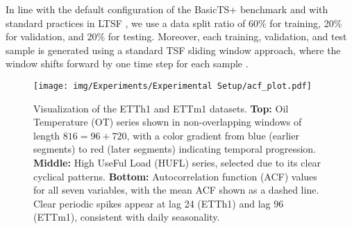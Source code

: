 \documentclass[a4paper,oneside,bibliography=totoc]{scrbook}
\begin{document}
In line with the default configuration of the BasicTS+ benchmark and with standard practices in LTSF \cite{zhou_informer_2021, nie_time_2022, liu_itransformer_2023, shang_ada-mshyper_2024}, we use a data split ratio of 60\% for training, 20\% for validation, and 20\% for testing. 
Moreover, each training, validation, and test sample is generated using a standard TSF sliding window approach,  where the window shifts forward by one time step for each sample \cite{shao_exploring_2025}.
\begin{figure}[h]
 \centering
 \texttt{[image: img/Experiments/Experimental Setup/acf\_plot.pdf]}
 \caption{Visualization of the ETTh1 and ETTm1 datasets. \textbf{Top:} Oil Temperature (OT) series shown in non-overlapping windows of length $816 = 96 + 720$, with a color gradient from blue (earlier segments) to red (later segments) indicating temporal progression. \textbf{Middle:} High UseFul Load (HUFL) series, selected due to its clear cyclical patterns. \textbf{Bottom:} Autocorrelation function (ACF) values for all seven variables, with the mean ACF shown as a dashed line. Clear periodic spikes appear at lag 24 (ETTh1) and lag 96 (ETTm1), consistent with daily seasonality.}
 \label{fig:data_acf}
\end{figure}
\end{document}
